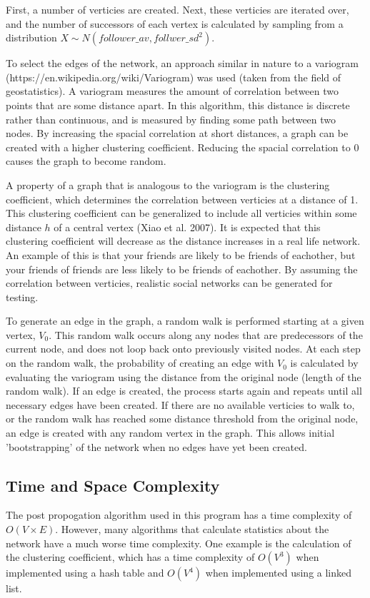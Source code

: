 \documentclass{article}
\begin{document}
First, a number of verticies are created.
Next, these verticies are iterated over, and the number of successors of each
vertex is calculated by sampling from a distribution $X \sim N\left(follower\_av, follwer\_sd^2\right)$.

To select the edges of the network, an approach similar in nature to a variogram
(https://en.wikipedia.org/wiki/Variogram) was used (taken from the field of geostatistics).
A variogram measures the amount of correlation between two points that are some distance apart.
In this algorithm, this distance is discrete rather than continuous, and is measured by finding
some path between two nodes. By increasing the spacial correlation at short distances,
a graph can be created with a higher clustering coefficient. Reducing the spacial correlation
to 0 causes the graph to become random.

A property of a graph that is analogous to the variogram is the clustering
coefficient, which determines the correlation between verticies at a distance of 1.
This clustering coefficient can be generalized to include all verticies
within some distance $h$ of a central vertex (Xiao et al. 2007).
It is expected that this clustering coefficient will decrease as the distance increases
in a real life network. An example of this is that your friends are likely to be friends of
eachother, but your friends of friends are less likely to be friends of eachother.
By assuming the correlation between verticies, realistic social networks can be generated
for testing.

To generate an edge in the graph, a random walk is performed starting at a given vertex, $V_0$.
This random walk occurs along any nodes that are predecessors of the current node,
and does not loop back onto previously visited nodes.
At each step on the random walk, the probability of creating an edge with $V_0$
is calculated by evaluating the variogram using the distance from the original node
(length of the random walk).
If an edge is created, the process
starts again and repeats until all necessary edges have been created.
If there are no available verticies to walk to,
or the random walk has reached some distance threshold from the original node,
an edge is created with any random vertex in the graph. This allows initial
'bootstrapping' of the network when no edges have yet been created.

\subsection{Time and Space Complexity}
The post propogation algorithm used in this program has a time complexity of
$O\left(V \times E\right)$. However, many algorithms that calculate statistics about the network have a much
worse time complexity. One example is the calculation of the clustering coefficient,
which has a time complexity of $O\left(V^3\right)$ when implemented using a hash table
and $O\left(V^4\right)$ when implemented using a linked list.
\end{document}
